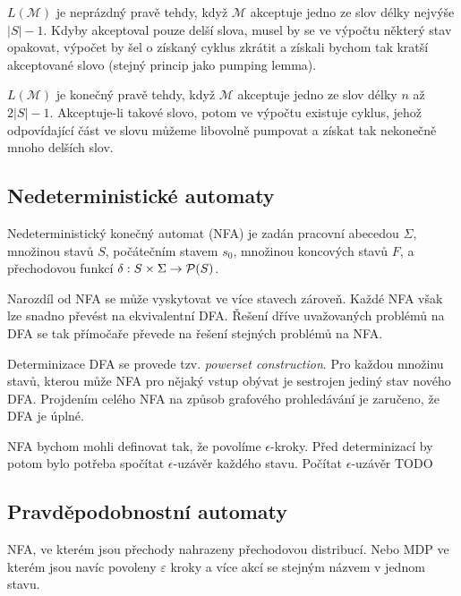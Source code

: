 $L(\mathcal{M})$ je neprázdný pravě tehdy, když $\mathcal{M}$
akceptuje jedno ze slov délky nejvýše $\lvert S \rvert -1$.
Kdyby akceptoval pouze delší slova, musel by se ve výpočtu některý stav
opakovat, výpočet by šel o získaný cyklus zkrátit a získali bychom tak
kratší akceptované slovo (stejný princip jako pumping lemma).

$L(\mathcal{M})$ je konečný pravě tehdy, když $\mathcal{M}$
akceptuje jedno ze slov délky $n$ až $2 \lvert S \rvert - 1$.
Akceptuje-li takové slovo, potom ve výpočtu existuje cyklus, jehož
odpovídající část ve slovu můžeme libovolně pumpovat a získat tak
nekonečně mnoho delších slov.

\subsection{Nedeterministické automaty}

\begin{definition}
    Nedeterministický konečný automat (NFA) je zadán
    pracovní abecedou $\Sigma$,
    množinou stavů $S$,
    počátečním stavem $s_0$,
    množinou koncových stavů $F$,
    a přechodovou funkcí $\delta : S \times \Sigma \to \mathcal{P}(S)$.
\end{definition}

Narozdíl od NFA se může vyskytovat ve více stavech zároveň. Každé NFA
však lze snadno převést na ekvivalentní DFA. Řešení dříve uvažovaných
problémů na DFA se tak přímočaře převede na řešení stejných problémů na
NFA.

Determinizace DFA se provede tzv. {\em powerset construction}. Pro
každou množinu stavů, kterou může NFA pro nějaký vstup obývat je
sestrojen jediný stav nového DFA. Projdením celého NFA na způsob
grafového prohledávání je zaručeno, že DFA je úplné.

NFA bychom mohli definovat tak, že povolíme $\epsilon$-kroky. Před
determinizací by potom bylo potřeba spočítat $\epsilon$-uzávěr každého
stavu. Počítat $\epsilon$-uzávěr TODO

\subsection{Pravděpodobnostní automaty}

NFA, ve kterém jsou přechody nahrazeny přechodovou distribucí.
Nebo MDP ve kterém jsou navíc povoleny $\varepsilon$ kroky a více akcí
se stejným názvem v jednom stavu.


